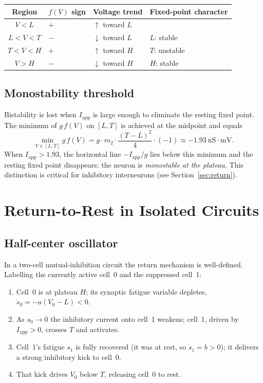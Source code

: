\documentclass[11pt]{article}
\begin{document}
\begin{center}
\begin{tabular}{clll}
\toprule
Region & $f(V)$ sign & Voltage trend & Fixed-point character \\
\midrule
$V < L$       & $+$ & $\uparrow$ toward $L$ & \\
$L < V < T$   & $-$ & $\downarrow$ toward $L$ & $L$: stable \\
$T < V < H$   & $+$ & $\uparrow$ toward $H$ & $T$: unstable \\
$V > H$       & $-$ & $\downarrow$ toward $H$ & $H$: stable \\
\bottomrule
\end{tabular}
\end{center}

\subsection*{Monostability threshold}

Bistability is lost when $I_{\mathrm{app}}$ is large enough to eliminate the resting fixed point.
The minimum of $g\,f(V)$ on $[L, T]$ is achieved at the midpoint and equals
\begin{equation}
    \min_{V\in[L,T]} g\,f(V)
    = g \cdot m_2 \cdot \frac{(T-L)^2}{4} \cdot (-1)
    \approx -1.93\ \mathrm{nS\cdot mV}.
\end{equation}
When $I_{\mathrm{app}} > 1.93$, the horizontal line $-I_{\mathrm{app}}/g$ lies below this minimum
and the resting fixed point disappears: the neuron is \emph{monostable at the plateau}.  This
distinction is critical for inhibitory interneurons (see Section~\ref{sec:return}).

\section{Return-to-Rest in Isolated Circuits}

\subsection{Half-center oscillator}

In a two-cell mutual-inhibition circuit the return mechanism is well-defined.  Labelling the
currently active cell~0 and the suppressed cell~1:

\begin{enumerate}
    \item Cell~0 is at plateau $H$; its synaptic fatigue variable depletes,
          $\dot{s}_0 = -a(V_0 - L) < 0$.
    \item As $s_0 \to 0$ the inhibitory current onto cell~1 weakens; cell~1, driven by
          $I_{\mathrm{app}} > 0$, crosses $T$ and activates.
    \item Cell~1's fatigue $s_1$ is fully recovered (it was at rest, so
          $\dot{s}_1 = b > 0$); it delivers a strong inhibitory kick to cell~0.
    \item That kick drives $V_0$ below $T$, releasing cell~0 to rest.
\end{enumerate}
\end{document}
